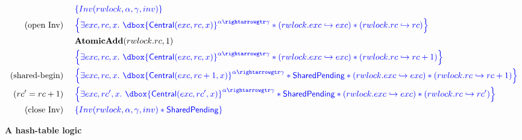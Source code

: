 \documentclass{article}
\newcommand\dboxed[1]{\dbox{\vphantom{t}\ensuremath{#1}}}
\newcommand{\pointsto}{\hookrightarrow}
\newcommand{\refines}{\rightarrowgtr}
\begin{document}
\begin{align*}
& \inlinehoare{ \Inv(\rwlock,\alpha,\gamma,\inv) } \\
\text{(open Inv)} ~~~~ & \inlinehoare{
        \exists exc,rc,x .~
            \dboxed{\Central(exc,rc,x)}^{\alpha \refines \gamma}
            * (\rwlock.\exc \pointsto exc)
            * (\rwlock.\rc \pointsto rc)
    }\\
& \AtomicAdd(\rwlock.\rc, 1) \\
& \inlinehoare{
        \exists exc,rc,x .~
            \dboxed{\Central(exc,rc,x)}^{\alpha \refines \gamma}
            * (\rwlock.\exc \pointsto exc)
            * (\rwlock.\rc \pointsto rc + 1)
    }\\
\text{(shared-begin)} ~~~~ & \inlinehoare{
        \exists exc,rc,x .~
            \dboxed{\Central(exc,rc + 1,x)}^{\alpha \refines \gamma}
            * \SharedPending
            * (\rwlock.\exc \pointsto exc)
            * (\rwlock.\rc \pointsto rc + 1)
    }\\
(rc'=rc+1) ~~~~ & \inlinehoare{
        \exists exc,rc',x .~
            \dboxed{\Central(exc,rc',x)}^{\alpha \refines \gamma}
            * \SharedPending
            * (\rwlock.\exc \pointsto exc)
            * (\rwlock.\rc \pointsto rc')
    }\\
\text{(close Inv)} ~~~~ & \inlinehoare{ \Inv(\rwlock,\alpha,\gamma,\inv) * \SharedPending } \nonumber\\
\end{align*}

\newpage

\textbf{A hash-table logic}

\newcommand{\hashto}{\stackrel{\text{map}}{\hookrightarrow}}
\newcommand{\entryto}{\stackrel{\text{linear}}{\hookrightarrow}}
\newcommand{\Some}{\text{Some}}
\newcommand{\None}{\text{None}}

\newcommand{\Query}{\text{Query}}
\newcommand{\QueryIter}{\text{QueryIter}}
\newcommand{\Update}{\text{Update}}
\newcommand{\UpdateIter}{\text{UpdateIter}}
\newcommand{\Remove}{\text{Remove}}
\newcommand{\RemoveIter}{\text{RemoveIter}}
\newcommand{\NotInRange}{\text{NotInRange}}

\newcommand{\hash}{\ensuremath{hash}}
\newcommand{\rec}{\textbf{rec}}
\end{document}
